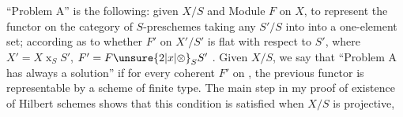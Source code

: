 ``Problem A'' is the following: given $X/S$ and  Module $F$ on $X$, to represent the functor on the category of $S$-preschemes taking any $S'/S$ into  into a one-element  set; according as to whether $F'$ on $X'/S'$ is flat with respect to $S'$, where $X'=X\mathbin{x}_S S'$, $F'=F\unsure{2|x|\otimes}_S S'$ . Given $X/S$, we say that ``Problem A  has always a solution'' if for every coherent $F'$ on , the previous functor  is representable by a scheme of finite type. The main step in my proof of existence of Hilbert schemes shows that this condition is satisfied when $X/S$ is projective,
